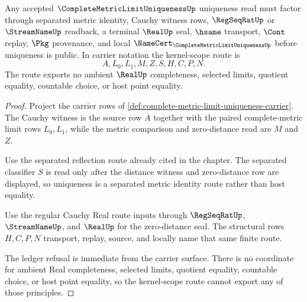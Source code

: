 \begin{theorem}
\label{thm:complete-metric-limit-uniqueness-kernel-scope}
Any accepted $\CompleteMetricLimitUniquenessUp$ uniqueness read must factor through separated metric identity, Cauchy witness rows, $\RegSeqRatUp$ or $\StreamNameUp$ readback, a terminal $\RealUp$ seal, $\hsame$ transport, $\Cont$ replay, $\Pkg$ provenance, and local $\NameCert_{\CompleteMetricLimitUniquenessUp}$ before uniqueness is public. In carrier notation the kernel-scope route is
$$
A,L_{0},L_{1},M,Z,S,H,C,P,N .
$$
The route exports no ambient $\RealUp$ completeness, selected limits, quotient equality, countable choice, or host point equality.
\end{theorem}
\begin{proof}
Project the carrier rows of \autoref{def:complete-metric-limit-uniqueness-carrier}. The Cauchy witness is the source row $A$ together with the paired complete-metric limit rows $L_{0},L_{1}$, while the metric comparison and zero-distance read are $M$ and $Z$.

Use the separated reflection route already cited in the chapter. The separated classifier $S$ is read only after the distance witness and zero-distance row are displayed, so uniqueness is a separated metric identity route rather than host equality.

Use the regular Cauchy Real route inputs through $\RegSeqRatUp$, $\StreamNameUp$, and $\RealUp$ for the zero-distance seal. The structural rows $H,C,P,N$ transport, replay, source, and locally name that same finite route.

The ledger refusal is immediate from the carrier surface. There is no coordinate for ambient Real completeness, selected limits, quotient equality, countable choice, or host point equality, so the kernel-scope route cannot export any of those principles.
\end{proof}

